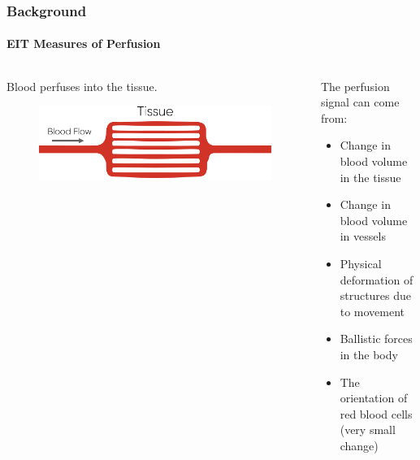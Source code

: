 \documentclass[10pt,    %
    english,            %
    xcolor=table,       %
    envcountsect,        %
    aspectratio=1610
]{beamer}
\begin{document}
\begin{frame}
	\frametitle{Background}
	\framesubtitle{EIT Measures of Perfusion}
	\begin{columns}[c]
		\begin{column}{0.5\textwidth}
			Blood perfuses into the tissue. \\ \vspace{2mm}
			\begin{figure}[H]
				\centering
				\includegraphics[width=\textwidth]{perfusion_sketch.pdf}
			\end{figure}
		\end{column}
		\begin{column}{0.5\textwidth}
			The perfusion signal can come from: \\ \vspace{2mm}
			\begin{itemize}
				\item Change in blood volume in the tissue
				\item Change in blood volume in vessels
				\item Physical deformation of structures due to movement
				\item Ballistic forces in the body 
				\item The orientation of red blood cells (very small change)
			\end{itemize}
		\end{column}
	\end{columns}
\end{frame}
\end{document}
